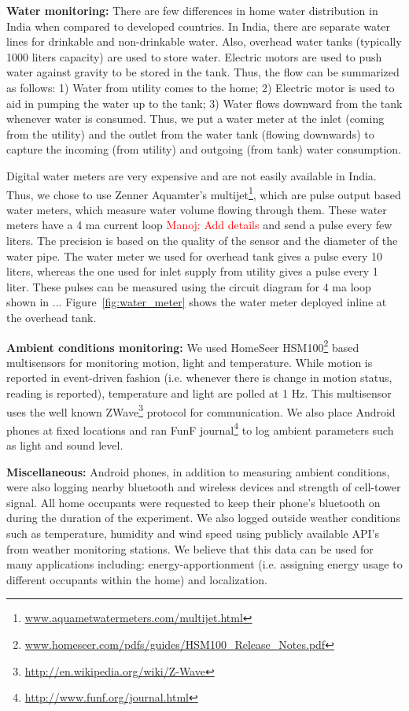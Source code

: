 \documentclass[10pt]{sensys-proc}
\newcommand{\redcolor}[1]{\textcolor{red}{#1}}
\newcommand{\figref}[1]{Figure~\ref{#1}}
\begin{document}
\noindent \textbf{Water monitoring:} There are few differences in home water distribution in India when compared to developed countries. In India, there are separate water lines for drinkable and non-drinkable water. Also, overhead water tanks (typically 1000 liters capacity) are used to store water. Electric motors are used to push water against gravity to be stored in the tank. Thus, the flow can be summarized as follows: 1) Water from utility comes to the home; 2) Electric motor is used to aid in pumping the water up to the tank; 3) Water flows downward from the tank whenever water is consumed. Thus, we put a water meter at the inlet (coming from the utility) and the outlet from the water tank (flowing downwards) to capture the incoming (from utility) and outgoing (from tank) water consumption. 


Digital water meters are very expensive and are not easily available in India. Thus, we chose to use Zenner Aquamter's multijet\footnote{\url{www.aquametwatermeters.com/multijet.html}}, which are pulse output based water meters, which measure water volume flowing through them. These water meters have a 4 ma current loop \redcolor{Manoj: Add details} and send a pulse every few liters. The precision is based on the quality of the sensor and the diameter of the water pipe. The water meter we used for overhead tank gives a pulse every 10 liters, whereas the one used for inlet supply from utility gives a pulse every 1 liter. These pulses can be measured using the circuit diagram for 4 ma loop shown in ... \figref{fig:water_meter} shows the water meter deployed inline at the overhead tank.

\noindent \textbf{Ambient conditions monitoring:} We used HomeSeer HSM100\footnote{\url{www.homeseer.com/pdfs/guides/HSM100_Release_Notes.pdf}} based multisensors for monitoring motion, light and temperature. While motion is reported in event-driven fashion (i.e. whenever there is change in motion status, reading is reported), temperature and light are polled at 1 Hz. This multisensor uses the well known ZWave\footnote{\url{http://en.wikipedia.org/wiki/Z-Wave}} protocol for communication. We also place Android phones at fixed locations and ran FunF journal\footnote{\url{http://www.funf.org/journal.html}} to log ambient parameters such as light and  sound level.

\noindent \textbf{Miscellaneous:} Android phones, in addition to measuring ambient conditions, were also logging nearby bluetooth and wireless devices and strength of cell-tower signal. All home occupants were requested to keep their phone's bluetooth on during the duration of the experiment. We also logged outside weather conditions such as temperature, humidity and wind speed using publicly available API's from weather monitoring stations. We believe that this data can be used for many applications including: energy-apportionment (i.e. assigning energy usage to different occupants within the home) and localization.
\end{document}
